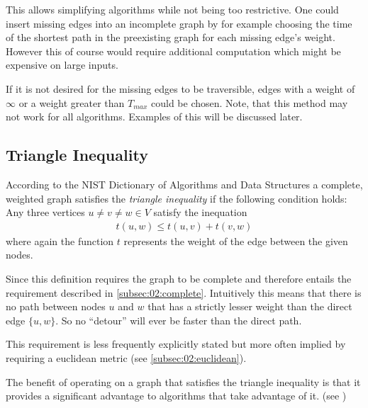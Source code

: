 This allows simplifying algorithms while not being too restrictive.
One could insert missing edges into an incomplete graph by for example choosing the time of the shortest path in the preexisting graph for each missing edge's weight.
However this of course would require additional computation which might be expensive on large inputs.

If it is not desired for the missing edges to be traversible,
edges with a weight of $\infty$ or a weight greater than $T_{max}$ could be chosen.
Note, that this method may not work for all algorithms. Examples of this will be discussed later. 

\subsection{Triangle Inequality}
\label{subsec:02:triangle}

According to the NIST Dictionary of Algorithms and Data Structures \cite{black_triangle_2004} a complete,
weighted graph satisfies the \emph{triangle inequality} if the following condition holds:
Any three vertices $u \neq v \neq w \in V$ satisfy the inequation
\begin{align*}
  t(u, w) \leq t(u, v) + t(v, w) 
\end{align*}
where again the function $t$ represents the weight of the edge between the given nodes.

Since this definition requires the graph to be complete and therefore entails the requirement described in \cref{subsec:02:complete}.
Intuitively this means that there is no path between nodes $u$ and $w$ that has a strictly lesser weight
than the direct edge $\{u, w\}$. So no \enquote{detour} will ever be faster than the direct path. 

This requirement is less frequently explicitly stated \cite{santini_hazardous_2022} but more often implied by requiring a euclidean metric (see \cref{subsec:02:euclidean}).

The benefit of operating on a graph that satisfies the triangle inequality
is that it provides a significant advantage to algorithms that take advantage of it.
(see )

